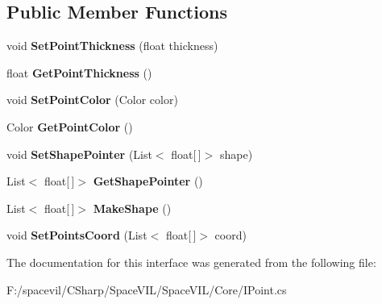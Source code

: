\subsection*{Public Member Functions}
\begin{DoxyCompactItemize}
\item 
\mbox{\label{interface_space_v_i_l_1_1_core_1_1_i_points_aceddbf8010ca2bf5749b1568338d8cbe}} 
void {\bfseries Set\+Point\+Thickness} (float thickness)
\item 
\mbox{\label{interface_space_v_i_l_1_1_core_1_1_i_points_a7c12ce35e77fdaa9411f2b268dd952fb}} 
float {\bfseries Get\+Point\+Thickness} ()
\item 
\mbox{\label{interface_space_v_i_l_1_1_core_1_1_i_points_a14b34f813fa022b8012debd8ce4cd90c}} 
void {\bfseries Set\+Point\+Color} (Color color)
\item 
\mbox{\label{interface_space_v_i_l_1_1_core_1_1_i_points_aa68b7d992f67dec150cf4dddcfd714fb}} 
Color {\bfseries Get\+Point\+Color} ()
\item 
\mbox{\label{interface_space_v_i_l_1_1_core_1_1_i_points_a4023971bd1864a861d8c44ee0d8f7095}} 
void {\bfseries Set\+Shape\+Pointer} (List$<$ float\mbox{[}$\,$\mbox{]}$>$ shape)
\item 
\mbox{\label{interface_space_v_i_l_1_1_core_1_1_i_points_a264c082aacca04f7b45049ceecac7876}} 
List$<$ float\mbox{[}$\,$\mbox{]}$>$ {\bfseries Get\+Shape\+Pointer} ()
\item 
\mbox{\label{interface_space_v_i_l_1_1_core_1_1_i_points_a81156696dec6126fc316641f36c41eca}} 
List$<$ float\mbox{[}$\,$\mbox{]}$>$ {\bfseries Make\+Shape} ()
\item 
\mbox{\label{interface_space_v_i_l_1_1_core_1_1_i_points_a21e6a7cec6c1eecc7c9b7a9eb8c8383e}} 
void {\bfseries Set\+Points\+Coord} (List$<$ float\mbox{[}$\,$\mbox{]}$>$ coord)
\end{DoxyCompactItemize}


The documentation for this interface was generated from the following file\+:\begin{DoxyCompactItemize}
\item 
F\+:/spacevil/\+C\+Sharp/\+Space\+V\+I\+L/\+Space\+V\+I\+L/\+Core/I\+Point.\+cs\end{DoxyCompactItemize}
